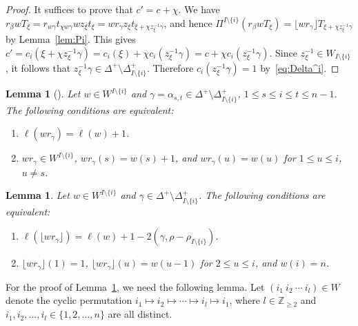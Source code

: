 \documentclass[10pt]{amsart}
\newtheorem{lemm}[theo]{Lemma}
\theoremstyle{definition}\newtheorem{defi}[theo]{Definition}
\theoremstyle{remark}\newtheorem{rema}[theo]{Remark}
\newcommand{\BZ}{\mathbb{Z}}
\begin{document}
\begin{proof}
It suffices to prove that 
$c' = c + \chi$. 
We have 
$r_{\beta} w T_{\xi} 
= r_{w\gamma} t_{\chi w\gamma} w z_{\xi} t_{\xi}
= w r_{\gamma} z_{\xi} t_{\xi + \chi z_{\xi}^{-1} \gamma}$, 
and hence 
$\Pi^{I \setminus \{ i \}}(r_{\beta} w T_{\xi}) 
= \lfloor wr_{\gamma} \rfloor T_{\xi + \chi z_{\xi}^{-1} \gamma}$
by Lemma~\ref{lem:Pi}. 
This gives 
$c' = c_i(\xi + \chi z_{\xi}^{-1} \gamma)
= c_i(\xi) + \chi c_i(z_{\xi}^{-1} \gamma) 
= c + \chi c_i(z_{\xi}^{-1} \gamma)$. 
Since 
$z_{\xi}^{-1} \in W_{I \setminus \{ i \}}$, 
it follows that 
$z_{\xi}^{-1} \gamma \in \Delta^+ \setminus \Delta_{I \setminus \{ i \}}^+$. 
Therefore 
$c_i(z_{\xi}^{-1} \gamma) = 1$
by~\eqref{eq:Delta^i}.
\end{proof}

\begin{lemm}[{\cite[Proposition~2.4.8]{BB}}]
\label{lem:B}
Let 
$w \in W^{I \setminus \{ i \}}$ 
and 
$\gamma = \alpha_{s,t} \in \Delta^+ \setminus \Delta_{I \setminus \{ i \}}^+$, 
$1 \leq s \leq i \leq t \leq n-1$. 
The following conditions are equivalent:
\begin{enumerate}[label=(\arabic*)]
\item\label{Lemm_4.14_1}
$\ell(w r_{\gamma}) = \ell(w) + 1$.
\item\label{Lemm_4.14_2}
$w r_{\gamma} \in W^{I \setminus \{ i \}}$, 
$w r_{\gamma}(s) = w(s) + 1$, 
and 
$w r_{\gamma}(u) = w(u)$ 
for $1 \leq u \leq i$, $u \neq s$.
\end{enumerate}
\end{lemm}

\begin{lemm} \label{lem:Q}
Let 
$w \in W^{I \setminus \{ i \}}$
and 
$\gamma \in \Delta^+ \setminus \Delta_{I \setminus \{ i \}}^+$. 
The following conditions are equivalent:
\begin{enumerate}[label=(\arabic*),series=lemma4.15]
\item\label{lemma4.15_1}
$\ell(\lfloor w r_{\gamma} \rfloor) = \ell(w) + 1 - 2(\gamma,\rho-\rho_{I \setminus \{ i \}})$.
\item\label{lemma4.15_2}
$\lfloor w r_{\gamma} \rfloor (1) = 1$, 
$\lfloor w r_{\gamma} \rfloor (u) = w(u-1)$ for $2 \leq u \leq i$, 
and 
$w(i) = n$.
\end{enumerate}
\end{lemm}

For the proof of Lemma~\ref{lem:Q}, 
we need the following lemma.
Let 
$(i_1 \ i_2 \ \cdots \ i_{l}) \in W$ 
denote the cyclic permutation 
$i_1 \mapsto i_2 \mapsto \cdots \mapsto i_{l} \mapsto i_1$, 
where 
$l \in \BZ_{\geq 2}$ 
and 
$i_1 , i_2 , \ldots , i_{l} \in \{ 1,2,\ldots ,n \}$
are all distinct. 
\end{document}

